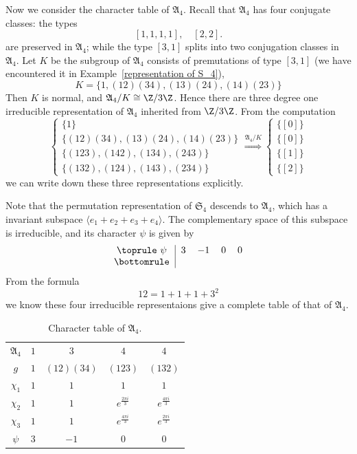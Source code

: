 \begin{example}
Now we consider the character table of $\mathfrak{A}_4$. Recall that $\mathfrak{A}_4$ has four conjugate classes: the types
\[[1,1,1,1],\quad [2,2].\]
are preserved in $\mathfrak{A}_4$; while the type $[3,1]$ splits into two conjugation classes in $\mathfrak{A}_4$. Let $K$ be the subgroup of $\mathfrak{A}_4$ consists of premutations of type $[3,1]$ (we have encountered it in Example~\ref{representation of S_4}),
\[K=\{1,(12)(34),(13)(24),(14)(23)\}\]
Then $K$ is normal, and $\mathfrak{A}_4/K\cong\Z/3\Z$. Hence there are three degree one irreducible representation of $\mathfrak{A}_4$ inherited from $\Z/3\Z$. From the computation 
\[\left\{\begin{array}{l}
\{1\}\\
\{(12)(34),(13)(24),(14)(23)\}\\
\{(123),(142),(134),(243)\}\\
\{(132),(124),(143),(234)\}
\end{array}\right. \stackrel{\mathfrak{A}_4/K}{\Longrightarrow}\left\{\begin{array}{l}
\{[0]\}\\
\{[0]\}\\
\{[1]\}\\
\{[2]\}
\end{array}\right. \]
we can write down these three representations explicitly.\par
Note that the permutation representation of $\mathfrak{S}_4$ descends to $\mathfrak{A}_4$, which has a invariant subspace $\langle e_1+e_2+e_3+e_4\rangle$. The complementary space of this subspace is irreducible, and its character $\psi$ is given by
\[\begin{tabular}{c|cccc}
\toprule
$\psi$&$3$&$-1$&$0$&$0$\\
\bottomrule
\end{tabular}\]
From the formula
\[12=1+1+1+3^2\]
we know these four irreducible representaions give a complete table of that of $\mathfrak{A}_4$.
\begin{table}[h]
\centering
\begin{tabular}{c|cccc}
\toprule
$\mathfrak{A}_4$&$1$&$3$&$4$&$4$\\
$g$&$1$&$(12)(34)$&$(123)$&$(132)$\\
\midrule
$\chi_{1}$&$1$&$1$&$1$&$1$\\
$\chi_{2}$&$1$&$1$&$e^{\frac{2\pi i}{3}}$&$e^{\frac{4\pi i}{3}}$\\
$\chi_{3}$&$1$&$1$&$e^{\frac{4\pi i}{3}}$&$e^{\frac{2\pi i}{3}}$\\
$\psi$&$3$&$-1$&$0$&$0$\\
\bottomrule
\end{tabular}
\caption{Character table of $\mathfrak{A}_4$.}
\label{char table of A_4}
\end{table}
\end{example}
